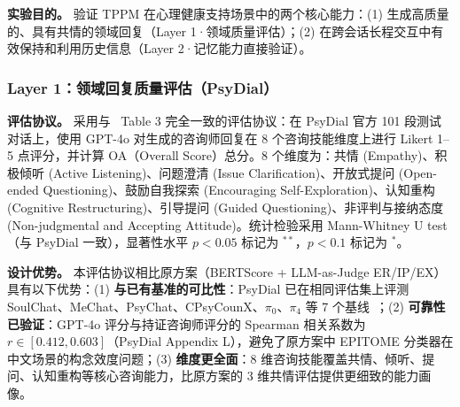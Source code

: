 \documentclass[12pt,a4paper]{article}
\begin{document}
\textbf{实验目的。} 验证 TPPM 在心理健康支持场景中的两个核心能力：(1) 生成高质量的、具有共情的领域回复（Layer 1·领域质量评估）；(2) 在跨会话长程交互中有效保持和利用历史信息（Layer 2·记忆能力直接验证）。

\subsubsection{Layer 1：领域回复质量评估（PsyDial）}

\textbf{评估协议。}
采用与~\cite{qiu2025psydial} Table 3 完全一致的评估协议：在 PsyDial 官方 101 段测试对话上，使用 GPT-4o 对生成的咨询师回复在 8 个咨询技能维度上进行 Likert 1--5 点评分，并计算 OA（Overall Score）总分。8 个维度为：共情 (Empathy)、积极倾听 (Active Listening)、问题澄清 (Issue Clarification)、开放式提问 (Open-ended Questioning)、鼓励自我探索 (Encouraging Self-Exploration)、认知重构 (Cognitive Restructuring)、引导提问 (Guided Questioning)、非评判与接纳态度 (Non-judgmental and Accepting Attitude)。统计检验采用 Mann-Whitney U test（与 PsyDial 一致），显著性水平 $p < 0.05$ 标记为 $^{**}$，$p < 0.1$ 标记为 $^{*}$。

\textbf{设计优势。}
本评估协议相比原方案（BERTScore + LLM-as-Judge ER/IP/EX）具有以下优势：(1) \textbf{与已有基准的可比性}：PsyDial 已在相同评估集上评测 SoulChat、MeChat、PsyChat、CPsyCounX、$\pi_0$、$\pi_4$ 等 7 个基线~\cite{qiu2025psydial}；(2) \textbf{可靠性已验证}：GPT-4o 评分与持证咨询师评分的 Spearman 相关系数为 $r \in [0.412, 0.603]$（PsyDial Appendix L），避免了原方案中 EPITOME 分类器在中文场景的构念效度问题；(3) \textbf{维度更全面}：8 维咨询技能覆盖共情、倾听、提问、认知重构等核心咨询能力，比原方案的 3 维共情评估提供更细致的能力画像。
\end{document}

